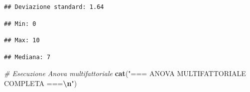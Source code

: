 \documentclass[
]{article}
\newenvironment{Shaded}{\begin{snugshade}}{\end{snugshade}}
\newcommand{\CommentTok}[1]{\textcolor[rgb]{0.56,0.35,0.01}{\textit{#1}}}
\newcommand{\FunctionTok}[1]{\textcolor[rgb]{0.13,0.29,0.53}{\textbf{#1}}}
\newcommand{\NormalTok}[1]{#1}
\newcommand{\SpecialCharTok}[1]{\textcolor[rgb]{0.81,0.36,0.00}{\textbf{#1}}}
\newcommand{\StringTok}[1]{\textcolor[rgb]{0.31,0.60,0.02}{#1}}
\begin{document}
\begin{verbatim}
## Deviazione standard: 1.64
\end{verbatim}

\begin{Shaded}
\end{Shaded}

\begin{verbatim}
## Min: 0
\end{verbatim}

\begin{Shaded}
\end{Shaded}

\begin{verbatim}
## Max: 10
\end{verbatim}

\begin{Shaded}
\end{Shaded}

\begin{verbatim}
## Mediana: 7
\end{verbatim}

\begin{Shaded}
\begin{Highlighting}[]
\CommentTok{\# Esecuzione Anova multifattoriale}
\FunctionTok{cat}\NormalTok{(}\StringTok{"=== ANOVA MULTIFATTORIALE COMPLETA ===}\SpecialCharTok{\textbackslash{}n}\StringTok{"}\NormalTok{)}
\end{Highlighting}
\end{Shaded}
\end{document}

